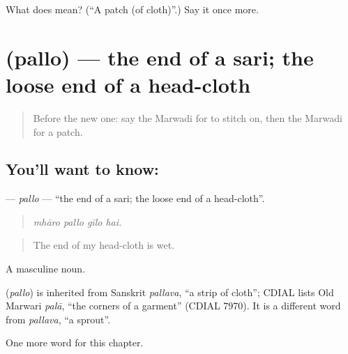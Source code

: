 \begin{tcolorbox}[breakable,colback=teal!4,colframe=teal!35!black,title={Before you move on}]
What does  mean? (\textquotedblleft{}A patch (of cloth)\textquotedblright{}.) Say it once more.
\end{tcolorbox}
\section[\texorpdfstring{\mw{पल्लो} (pallo)}{पल्लो (pallo)}]{ (pallo) — the end of a sari; the loose end of a head-cloth}

\label{lesson:MW-C177-pallo}



\begin{quote}
Before the new one: say the Marwadi for to stitch on, then the Marwadi for a patch.
\end{quote}

\subsection*{You'll want to know: }
\textbf{} — \emph{pallo} — \textquotedblleft{}the end of a sari; the loose end of a head-cloth\textquotedblright{}.

\begin{quote}
   
\end{quote}

\begin{quote}
\emph{mhāro pallo gīlo hai.}
\end{quote}

\begin{quote}
The end of my head-cloth is wet.
\end{quote}

A masculine noun.

\begin{cousinweb}
\textbf{} (\emph{pallo}) is inherited from Sanskrit \emph{pallava}, \textquotedblleft{}a strip of cloth\textquotedblright{}; CDIAL lists Old Marwari \emph{palā}, \textquotedblleft{}the corners of a garment\textquotedblright{} (CDIAL 7970). It is a different word from \emph{pallava}, \textquotedblleft{}a sprout\textquotedblright{}.
\end{cousinweb}

\begin{grammarlens}[title={What you've built}]
One more word for this chapter.
\end{grammarlens}

